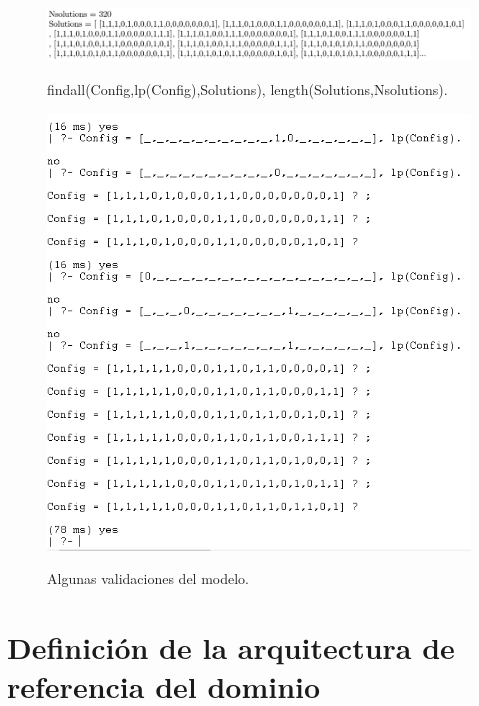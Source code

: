 \documentclass[10pt,a4paper,openany]{book}
\begin{document}
\begin{figure}[h]
	\centering
	\caption{findall(Config,lp(Config),Solutions), length(Solutions,Nsolutions).}
	\includegraphics[width=1\textwidth]{gnu1}
	\label{fig:gnu1}
\end{figure}

\begin{figure}[h]
	\centering
	\caption{Algunas validaciones del modelo.}
	\includegraphics[width=1\textwidth]{gnu2}
	\label{fig:gnu2}
\end{figure}



\chapter{Definición de la arquitectura de referencia del dominio}

\medskip


\end{document}
